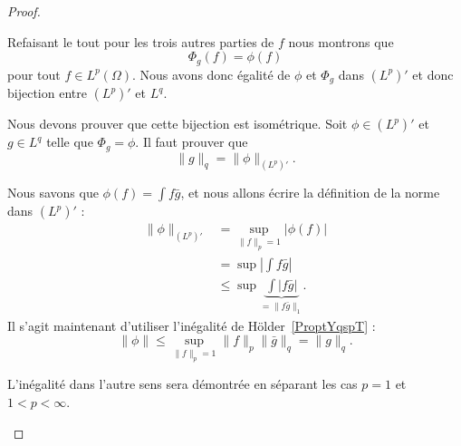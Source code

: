\begin{proof}
\begin{subproof}
		Refaisant le tout pour les trois autres parties de \( f\) nous montrons que
		\begin{equation}
			\Phi_g(f)=\phi(f)
		\end{equation}
		pour tout \( f\in L^p(\Omega)\). Nous avons donc égalité de \( \phi\) et \( \Phi_g\) dans \(  (L^p)' \) et donc bijection entre \( (L^p)'\) et \( L^q\).


		Nous devons prouver que cette bijection est isométrique. Soit \( \phi\in (L^p)'\) et \( g\in L^q\) telle que \( \Phi_g=\phi\). Il faut prouver que
		\begin{equation}
			\| g \|_q=\| \phi \|_{(L^p)'}.
		\end{equation}


		Nous savons que \( \phi(f)=\int f\bar g\), et nous allons écrire la définition de la norme dans \( (L^p)'\) :
		\begin{subequations}
			\begin{align}
				\| \phi \|_{(L^p)'} & =\sup_{\| f \|_p=1}\big| \phi(f) \big|                   \\
				                    & =\sup| \int f\bar g |                                    \\
				                    & \leq\sup\underbrace{\int| f\bar g |}_{=\| f\bar g \|_1}.
			\end{align}
		\end{subequations}
		Il s'agit maintenant d'utiliser l'inégalité de Hölder~\ref{ProptYqspT} :
		\begin{equation}
			\| \phi \|\leq \sup_{\| f \|_p=1}\| f \|_p\| \bar g \|_q=\| g \|_q.
		\end{equation}

		L'inégalité dans l'autre sens sera démontrée en séparant les cas \( p=1\) et \( 1<p<\infty\).


\end{subproof}
\end{proof}
